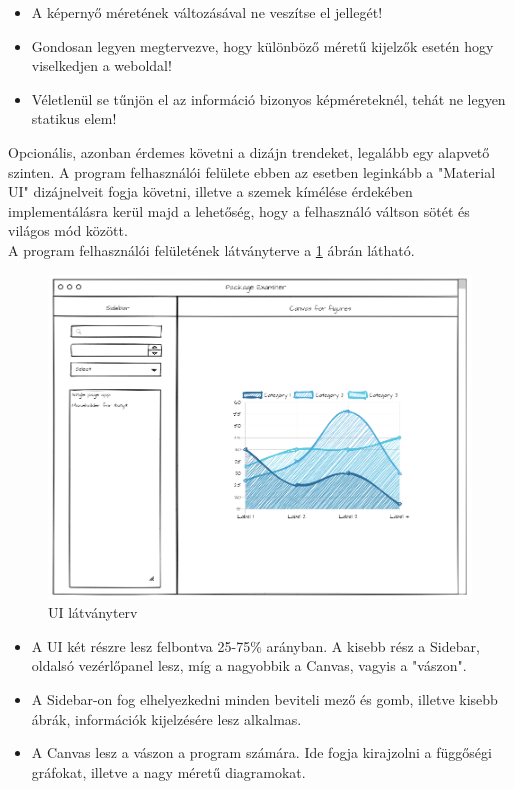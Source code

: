 \begin{itemize}
	\item A képernyő méretének változásával ne veszítse el jellegét!
	\item Gondosan legyen megtervezve, hogy különböző méretű kijelzők esetén hogy viselkedjen a weboldal!
	\item Véletlenül se tűnjön el az információ bizonyos képméreteknél, tehát ne legyen statikus elem!
\end{itemize}

Opcionális, azonban érdemes követni a dizájn trendeket, legalább egy alapvető szinten. A program felhasználói felülete ebben az esetben leginkább a "Material UI" dizájnelveit fogja követni, illetve a szemek kímélése érdekében implementálásra kerül majd a lehetőség, hogy a felhasználó váltson sötét és világos mód között.\\

A program felhasználói felületének látványterve a \ref{fig:ui_plan} ábrán látható.

\begin{figure}[!h]
	\centering
	\includegraphics[scale=0.5]{images/ui_plan.png}
	\caption{UI látványterv}
	\label{fig:ui_plan}
\end{figure}

\pagebreak

\begin{itemize}
	\item A UI két részre lesz felbontva 25-75\% arányban.  A kisebb rész a Sidebar, oldalsó vezérlőpanel lesz, míg a nagyobbik a Canvas, vagyis a "vászon".
	\item A Sidebar-on fog elhelyezkedni minden beviteli mező és gomb, illetve kisebb ábrák, információk kijelzésére lesz alkalmas.
	\item A Canvas lesz a vászon a program számára. Ide fogja kirajzolni a függőségi gráfokat, illetve a nagy méretű diagramokat.
\end{itemize}

